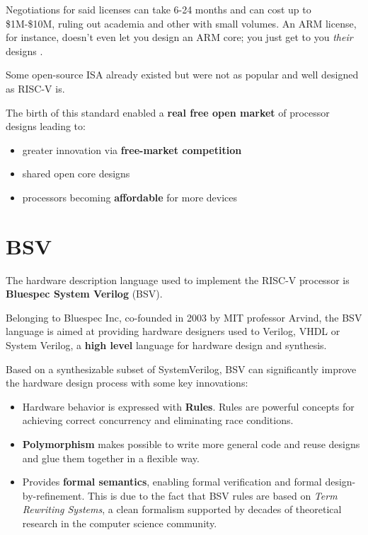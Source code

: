 \documentclass[12pt,oneside,a4paper]{article}
\begin{document}
Negotiations for said licenses can take 6-24 months and can cost up to \$1M-\$10M, ruling out academia and other with small volumes. An ARM license, for instance, doesn't even let you design an ARM core; you just get to you \textit{their} designs \cite{risc-v_free}.

Some open-source ISA already existed but were not as popular and well designed as RISC-V is.

The birth of this standard enabled a \textbf{real free open market} of processor designs leading to:
\begin{itemize}
	\item greater innovation via \textbf{free-market competition}
	\item shared open core designs
	\item processors becoming \textbf{affordable} for more devices
\end{itemize}

\section{BSV}
The hardware description language used to implement the RISC-V processor is \textbf{Bluespec System Verilog} (BSV).

Belonging to Bluespec Inc, co-founded in 2003 by MIT professor Arvind, the BSV language is aimed at providing hardware designers used to Verilog, VHDL or System Verilog, a \textbf{high level} language for hardware design and synthesis.

Based on a synthesizable subset of SystemVerilog, BSV can significantly improve the hardware design process with some key innovations: 

\begin{itemize}
	\item Hardware behavior is expressed with \textbf{Rules}.
	Rules are powerful concepts for achieving correct concurrency and eliminating race conditions.
	\item \textbf{Polymorphism} makes possible to write more general code and reuse designs and glue them together in a flexible way.
	\item Provides \textbf{formal semantics}, enabling formal verification and formal design-by-refinement. This is due to the fact that BSV rules are based on \textit{Term Rewriting Systems}, a clean formalism supported by decades of theoretical research in the computer science community.
\end{itemize}
\end{document}
